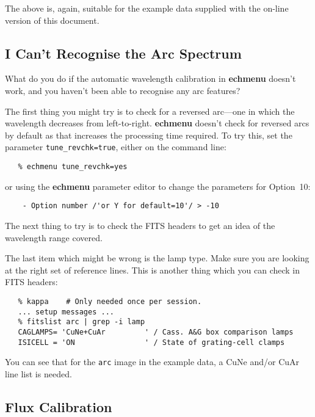 \documentclass[twoside,11pt]{article}
\newcommand{\htmlref}[2]{#1}
\newcommand{\xref}[3]{#1}
\newcommand{\xlabel}[1]{}
\newcommand{\mlabel}[1]{\xlabel{#1}\label{#1}}
\newcommand{\scspec}[2]{#1}
\newcommand{\scspec}[2]{#2}
\begin{document}
The above is, again, suitable for the example data supplied with the
on-line version of this document.


\subsection{\mlabel{cook_arc_reverse}I Can't Recognise the Arc Spectrum}

What do you do if the
\xref{automatic wavelength calibration}{sun152}{option10} in
\xref{{\bf echmenu}}{sun152}{ECHMENU} doesn't work, and you haven't been
able to recognise any arc features?

The first thing you might try is to check for a reversed
arc\scspec{---}{ - }one in which the wavelength decreases from left-to-right.
{\bf echmenu} doesn't check for reversed arcs by default as that increases
the processing time required.
To try this, set the parameter \xref{{\tt tune\_revchk=true}}
{sun152}{par_TUNE_REVCHK}, either on the command line:

{
\scspec{\small}{ }
\begin{verbatim}
   % echmenu tune_revchk=yes
\end{verbatim}
}

or using the {\bf echmenu} \htmlref{parameter editor}
{cook_parameter_editor} to change the parameters for Option~10:

{
\scspec{\small}{ }
\begin{verbatim}
    - Option number /'or Y for default=10'/ > -10
\end{verbatim}
}

The next thing to try is to \htmlref{check the FITS headers}
{cook_wavelength} to get an idea of the wavelength range covered.

The last item which might be wrong is the lamp type.  Make sure you are
looking at the right set of reference lines.  This is another thing which
you can check in FITS headers:

{
\scspec{\small}{ }
\begin{verbatim}
   % kappa    # Only needed once per session.
   ... setup messages ...
   % fitslist arc | grep -i lamp
   CAGLAMPS= 'CuNe+CuAr         ' / Cass. A&G box comparison lamps
   ISICELL = 'ON                ' / State of grating-cell clamps
\end{verbatim}
}

You can see that for the \verb+arc+ image in the example data, a
CuNe and/or CuAr line list is needed.


\subsection{\mlabel{cook_flux_calibration}Flux Calibration}
\end{document}
